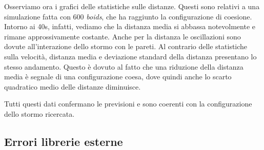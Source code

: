 \documentclass{article}
\begin{document}
Osserviamo ora i grafici delle statistiche sulle distanze. Questi sono relativi a una simulazione fatta con 600 \textit{boids}, che ha raggiunto la configurazione di coesione. Intorno ai 40s, infatti, vediamo che la distanza media si abbassa notevolmente e rimane approssivamente costante. Anche per la distanza le oscillazioni sono dovute all'interazione dello stormo con le pareti. Al contrario delle statistiche sulla velocità, distanza media e deviazione standard della distanza presentano lo stesso andamento. Questo è dovuto al fatto che una riduzione della distanza media è segnale di una configurazione coesa, dove quindi anche lo scarto quadratico medio delle distanze diminuisce.

Tutti questi dati confermano le previsioni e sono coerenti con la configurazione dello stormo ricercata. 

\subsection{Errori librerie esterne}
\end{document}

